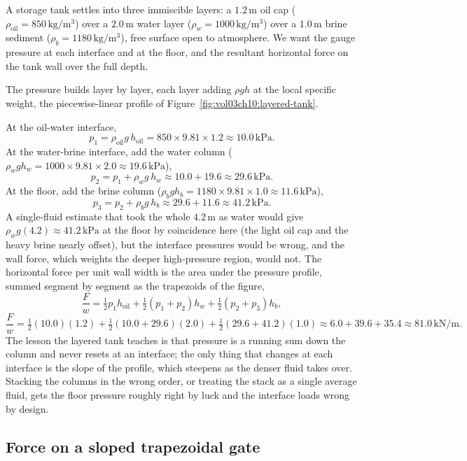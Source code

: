 A storage tank settles into three immiscible layers: a $1.2\,\si{\meter}$
oil cap ($\rho_{\text{oil}} = 850\,\si{\kilogram\per\meter\cubed}$) over a
$2.0\,\si{\meter}$ water layer ($\rho_w = 1000\,\si{\kilogram\per\meter
\cubed}$) over a $1.0\,\si{\meter}$ brine sediment ($\rho_b = 1180\,\si{
\kilogram\per\meter\cubed}$), free surface open to atmosphere. We want the
gauge pressure at each interface and at the floor, and the resultant
horizontal force on the tank wall over the full depth.

The pressure builds layer by layer, each layer adding $\rho g h$ at the
local specific weight, the piecewise-linear profile of
Figure~\ref{fig:vol03ch10:layered-tank}.



At the oil-water interface,
\[
p_1 = \rho_{\text{oil}} g\, h_{\text{oil}}
= 850 \times 9.81 \times 1.2 \approx 10.0\,\text{kPa}.
\]
At the water-brine interface, add the water column ($\rho_w g h_w = 1000
\times 9.81 \times 2.0 \approx 19.6\,\text{kPa}$),
\[
p_2 = p_1 + \rho_w g\, h_w
\approx 10.0 + 19.6 \approx 29.6\,\text{kPa}.
\]
At the floor, add the brine column ($\rho_b g h_b = 1180 \times 9.81 \times
1.0 \approx 11.6\,\text{kPa}$),
\[
p_3 = p_2 + \rho_b g\, h_b
\approx 29.6 + 11.6 \approx 41.2\,\text{kPa}.
\]
A single-fluid estimate that took the whole $4.2\,\si{\meter}$ as water
would give $\rho_w g (4.2) \approx 41.2\,\text{kPa}$ at the floor by
coincidence here (the light oil cap and the heavy brine nearly offset), but
the interface pressures would be wrong, and the wall force, which weights
the deeper high-pressure region, would not. The horizontal force per unit
wall width is the area under the pressure profile, summed segment by
segment as the trapezoids of the figure,
\[
\frac{F}{w} = \tfrac12 p_1 h_{\text{oil}}
+ \tfrac12 (p_1 + p_2) h_w
+ \tfrac12 (p_2 + p_3) h_b,
\]
\[
\frac{F}{w} = \tfrac12 (10.0)(1.2) + \tfrac12 (10.0 + 29.6)(2.0)
+ \tfrac12 (29.6 + 41.2)(1.0)
\approx 6.0 + 39.6 + 35.4 \approx 81.0\,\text{kN/m}.
\]
The lesson the layered tank teaches is that pressure is a running sum down
the column and never resets at an interface; the only thing that changes at
each interface is the slope of the profile, which steepens as the denser
fluid takes over. Stacking the columns in the wrong order, or treating the
stack as a single average fluid, gets the floor pressure roughly right by
luck and the interface loads wrong by design.

\subsection{Force on a sloped trapezoidal gate}


